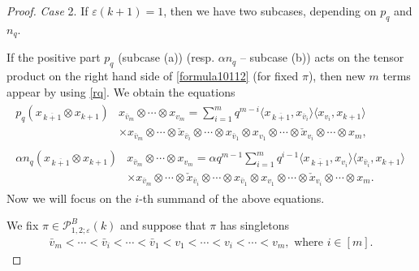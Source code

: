 \documentclass[11pt]{article}
\numberwithin{equation}{section}
\numberwithin{equation}{section}
\def\ell {n}
\def\PB{\mathcal{P}^{B}}
\renewcommand{\epsilon}{\varepsilon}
\newcommand{\q}{q}
\newcommand{\s}{\alpha}%
\begin{document}
\begin{proof}
\smallskip\noindent
\emph{Case} 2. If $\epsilon(k+1)=1$, then we have two subcases, depending on $p_\q$ and $\ell_{\q}$.

If the positive part $p_\q $ (subcase (a)) (resp. $\s \ell_{\q}$ -- subcase (b)) acts on the tensor product on the right hand side of \eqref{formula10112} (for fixed $\pi$), then new $m$ terms appear by using \eqref{rq}. We obtain the equations
\begin{subequations}
\begin{align}
	\begin{split}
		p_\q(x_{\,\overline{k+1}}\otimes x_{k+1}) & x_{\bar v_m}\otimes \cdots \otimes x_{v_m}=
		\sum_{i=1}^m \q^{m-i}\langle x_{\,\overline{k+1}},x_{\bar v_i}\rangle \langle x_{v_i} ,x_{k+1}\rangle\, \\ &\times x_{\bar v_m }\otimes \cdots \otimes \check{x}_{\bar v_i} \otimes \cdots \otimes x_{\bar v_1} \otimes x_{v_1}\otimes \cdots \otimes \check{x}_{v_i} \otimes \cdots \otimes x_m,
	\end{split}\label{eq:equatinpomocdowodgolwny1}
	\\
	\begin{split}
		\alpha\ell_\q(x_{\,\overline{k+1}}\otimes x_{k+1}) & x_{\bar v_m}\otimes \cdots \otimes x_{v_m}=
		\alpha\q^{m-1}\sum_{i=1}^m \q^{i-1}
		\langle x_{\,\overline{k+1}},x_{ v_i}\rangle \langle x_{\bar v_i} ,x_{k+1}\rangle\, \\& \times x_{\bar v_m }\otimes \cdots \otimes \check{x}_{\bar v_i} \otimes \cdots \otimes x_{\bar v_1} \otimes x_{v_1}\otimes \cdots \otimes \check{x}_{v_i} \otimes \cdots \otimes x_m.
	\end{split}\label{eq:equatinpomocdowodgolwny2}
\end{align}
\end{subequations}
Now we will focus on the $i$-th summand of the above equations.

We fix $\pi\in \PB_{1,2;\epsilon}(k)$ and suppose that $\pi$ has singletons
\begin{align*}
\bar v_m<\cdots <\bar v_{ i} < \cdots <\bar v_1 < v_1<\cdots <v_i <\cdots <v_m,\text{ where } i\in [m].
\end{align*}


\end{proof}
\end{document}
